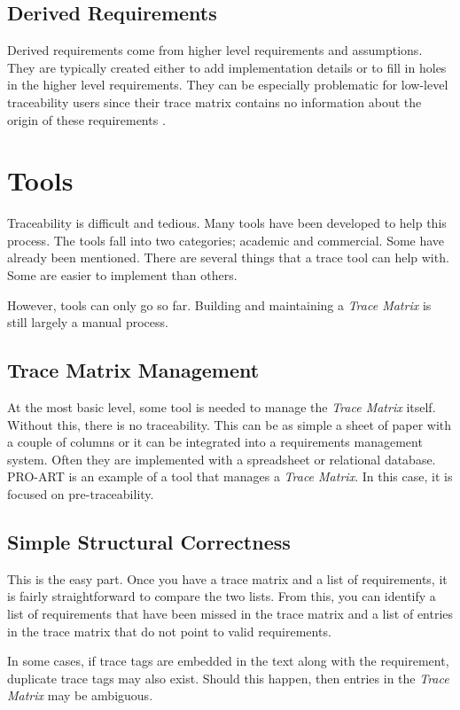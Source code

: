 \documentclass[10pt, openany]{report}
\newcommand{\trace}{\emph{Trace Matrix}}
\begin{document}
\section{Derived Requirements}
Derived requirements come from higher level requirements and assumptions.  They are typically created either to add implementation details or to fill in holes in the higher level requirements.  They can be especially problematic for low-level traceability users since their trace matrix contains no information about the origin of these requirements \cite{req2}.

\chapter{Tools}
Traceability is difficult and tedious.  Many tools have been developed to help this process.  The tools fall into two categories; academic and commercial.  Some have already been mentioned.  There are several things that a trace tool can help with.  Some are easier to implement than others.

However, tools can only go so far.  Building and maintaining a \trace{} is still largely a manual process\cite{req9}.

\section{Trace Matrix Management}
At the most basic level, some tool is needed to manage the \trace{} itself.  Without this, there is no traceability.  This can be as simple a sheet of paper with a couple of columns or it can be integrated into a requirements management system.  Often they are implemented with a spreadsheet or relational database.  PRO-ART\cite{req5} is an example of a tool that manages a \trace{}.  In this case, it is focused on pre-traceability.

\section{Simple Structural Correctness}
This is the easy part.  Once you have a trace matrix and a list of requirements, it is fairly straightforward to compare the two lists.  From this, you can identify a list of requirements that have been missed in the trace matrix and a list of entries in the trace matrix that do not point to valid requirements.

In some cases, if trace tags are embedded in the text along with the requirement, duplicate trace tags may also exist.  Should this happen, then entries in the \trace{} may be ambiguous.
\end{document}
